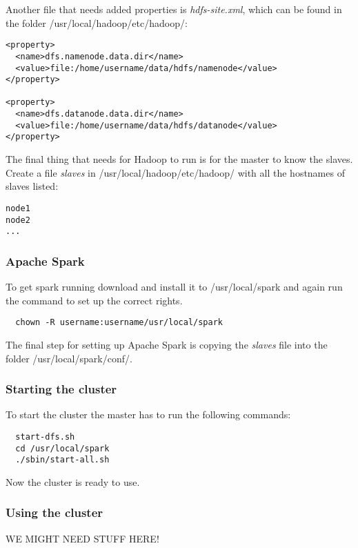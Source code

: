 Another file that needs added properties is \emph{hdfs-site.xml}, which can be found in the folder \textsf{/usr/local/hadoop/etc/hadoop/}:
\begin{verbatim}
<property>
  <name>dfs.namenode.data.dir</name>
  <value>file:/home/username/data/hdfs/namenode</value>
</property>

<property>
  <name>dfs.datanode.data.dir</name>
  <value>file:/home/username/data/hdfs/datanode</value>
</property>
\end{verbatim}
The final thing that needs for Hadoop to run is for the master to know the slaves. Create a file \emph{slaves} in \textsf{/usr/local/hadoop/etc/hadoop/} with all the hostnames of slaves listed:
\begin{verbatim}
node1
node2
...
\end{verbatim}

\subsubsection*{Apache Spark}
To get spark running download and install it to \textsf{/usr/local/spark} and again run the command to set up the correct rights.
\begin{lstlisting}
  chown -R username:username/usr/local/spark
\end{lstlisting}
The final step for setting up Apache Spark is copying the \emph{slaves} file into the folder \textsf{/usr/local/spark/conf/}.


\subsubsection*{Starting the cluster}
To start the cluster the master has to run the following commands:
\begin{lstlisting}
  start-dfs.sh
  cd /usr/local/spark
  ./sbin/start-all.sh
\end{lstlisting}
Now the cluster is ready to use.

\subsubsection*{Using the cluster}
WE MIGHT NEED STUFF HERE!

